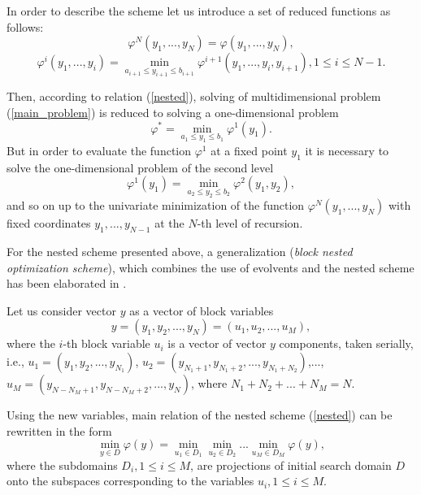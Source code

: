 \documentclass[runningheads]{llncs}
\begin{document}
In order to describe the scheme let us introduce a set of reduced functions 
as follows:
\begin{equation}\label{nested_N}
\varphi^N(y_1,...,y_N) = \varphi(y_1,...,y_N),
\end{equation}
\begin{equation}\label{nested_i}
\varphi^i(y_1,...,y_i) = \min_{a_{i+1}\leq y_{i+1}\leq b_{i+1}} \varphi^{i+1}(
y_1,...,y_i,y_{i+1}), 1\leq i\leq N-1.
\end{equation}

Then, according to relation (\ref{nested}), solving of multidimensional 
problem (\ref{main_problem}) is reduced to solving a one-dimensional problem 
\begin{equation}\label{nested_1}
\varphi^* = \min_{a_1\leq y_1\leq b_1}\varphi^1(y_1).
\end{equation}
But in order to evaluate the function $\varphi^1$ at a fixed point $y_1$ it 
is necessary to solve the one-dimensional problem of the second level
\begin{equation}
\varphi^1(y_1) = \min_{a_2\leq y_2\leq b_2}\varphi^2(y_1,y_2),
\end{equation}
and so on up to the univariate minimization of the function $\varphi^N(y_1
,...,y_N)$ with fixed coordinates $y_1,...,y_{N-1}$ at the $N$-th level of 
recursion.

For the nested scheme presented above, a generalization (\textit{block nested 
optimization scheme}), which combines the use of evolvents and the nested 
scheme has been elaborated in \cite{Barkalov2016}.

Let us consider vector $y$ as a vector of block variables
\begin{equation}
y=(y_1,y_2,...,y_N)=(u_1,u_2,...,u_M),
\end{equation}
where the $i$-th block variable $u_i$ is a vector of vector $y$ components, 
taken serially, i.e., $u_1=(y_1,y_2,...,y_{N_1})$, $u_2=(y_{N_1+1},y_{N_1+2}
,...,y_{N_1+N_2})$,..., $u_M=(y_{N-N_M+1},y_{N-N_M+2},...,y_{N})$, where $N_1+
N_2+...+N_M=N$.

Using the new variables, main relation of the nested scheme (\ref{nested}) 
can be rewritten in the form 
\begin{equation}\label{block_nested}
\min_{y \in D}\varphi(y) = \min_{u_1\in D_1}\min_{u_2\in D_2}...\min_{u_M \in 
D_M}\varphi(y),
\end{equation}
where the subdomains $D_i, 1 \leq i \leq M$, are projections of initial 
search domain $D$ onto the subspaces corresponding to the variables $u_i, 1 
\leq i \leq M$.
\end{document}

